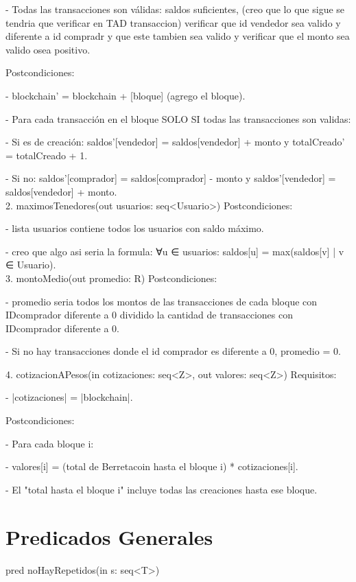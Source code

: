 \documentclass[10pt,a4paper]{article}
\begin{document}
{{    - Todas las transacciones son válidas: saldos suficientes, (creo que lo que sigue se tendria que verificar en TAD transaccion) verificar que id vendedor sea valido y diferente a id compradr y que este tambien sea valido y verificar que el monto sea valido osea positivo.

Postcondiciones:

    - blockchain' = blockchain + [bloque] (agrego el bloque).

    - Para cada transacción en el bloque SOLO SI todas las transacciones son validas:

        - Si es de creación: saldos'[vendedor] = saldos[vendedor] + monto y totalCreado' = totalCreado + 1.

        - Si no: saldos'[comprador] = saldos[comprador] - monto y saldos'[vendedor] = saldos[vendedor] + monto.\\

2. maximosTenedores(out usuarios: seq<Usuario>)
Postcondiciones:

    - lista usuarios contiene todos los usuarios con saldo máximo.

        - creo que algo asi seria la formula: ∀u ∈ usuarios: saldos[u] = max({saldos[v] | v ∈ Usuario}).\\

3. montoMedio(out promedio: R)
Postcondiciones:

    - promedio seria todos los montos de las transacciones de cada bloque con IDcomprador diferente a 0 dividido la cantidad de transacciones con IDcomprador diferente a 0.

    - Si no hay transacciones donde el id comprador es diferente a 0, promedio = 0.

4. cotizacionAPesos(in cotizaciones: seq<Z>, out valores: seq<Z>)
Requisitos:

    - |cotizaciones| = |blockchain|.

Postcondiciones:

    - Para cada bloque i:

    - valores[i] = (total de Berretacoin hasta el bloque i) * cotizaciones[i].

    - El "total hasta el bloque i" incluye todas las creaciones hasta ese bloque.


}


\section{Predicados Generales}
pred noHayRepetidos(in s: seq<T>){

}}
\end{document}
